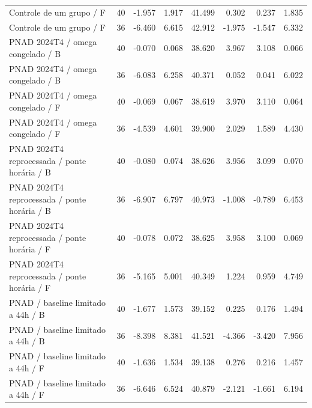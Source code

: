 \begin{tabular}{llrrrrrr}
Controle de um grupo / F & 40 & -1.957 & 1.917 & 41.499 & 0.302 & 0.237 & 1.835 \\
Controle de um grupo / F & 36 & -6.460 & 6.615 & 42.912 & -1.975 & -1.547 & 6.332 \\
PNAD 2024T4 / omega congelado / B & 40 & -0.070 & 0.068 & 38.620 & 3.967 & 3.108 & 0.066 \\
PNAD 2024T4 / omega congelado / B & 36 & -6.083 & 6.258 & 40.371 & 0.052 & 0.041 & 6.022 \\
PNAD 2024T4 / omega congelado / F & 40 & -0.069 & 0.067 & 38.619 & 3.970 & 3.110 & 0.064 \\
PNAD 2024T4 / omega congelado / F & 36 & -4.539 & 4.601 & 39.900 & 2.029 & 1.589 & 4.430 \\
PNAD 2024T4 reprocessada / ponte horária / B & 40 & -0.080 & 0.074 & 38.626 & 3.956 & 3.099 & 0.070 \\
PNAD 2024T4 reprocessada / ponte horária / B & 36 & -6.907 & 6.797 & 40.973 & -1.008 & -0.789 & 6.453 \\
PNAD 2024T4 reprocessada / ponte horária / F & 40 & -0.078 & 0.072 & 38.625 & 3.958 & 3.100 & 0.069 \\
PNAD 2024T4 reprocessada / ponte horária / F & 36 & -5.165 & 5.001 & 40.349 & 1.224 & 0.959 & 4.749 \\
PNAD / baseline limitado a 44h / B & 40 & -1.677 & 1.573 & 39.152 & 0.225 & 0.176 & 1.494 \\
PNAD / baseline limitado a 44h / B & 36 & -8.398 & 8.381 & 41.521 & -4.366 & -3.420 & 7.956 \\
PNAD / baseline limitado a 44h / F & 40 & -1.636 & 1.534 & 39.138 & 0.276 & 0.216 & 1.457 \\
PNAD / baseline limitado a 44h / F & 36 & -6.646 & 6.524 & 40.879 & -2.121 & -1.661 & 6.194 \\
\hline
\end{tabular}